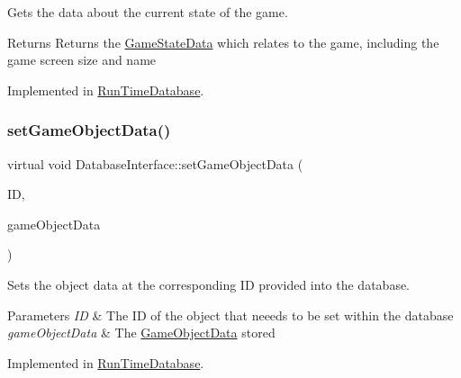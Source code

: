 Gets the data about the current state of the game. 

\begin{DoxyReturn}{Returns}
Returns the \hyperlink{struct_game_state_data}{Game\+State\+Data} which relates to the game, including the game screen size and name 
\end{DoxyReturn}


Implemented in \hyperlink{class_run_time_database_a15d6105d3d772f604c42813e50ba4ee3}{Run\+Time\+Database}.

\mbox{\label{class_database_interface_ae1914371cb425f71ba750f57f968b491}} 
\subsubsection{\texorpdfstring{set\+Game\+Object\+Data()}{setGameObjectData()}}
{\footnotesize\ttfamily virtual void Database\+Interface\+::set\+Game\+Object\+Data (\begin{DoxyParamCaption}\item[{std\+::string}]{ID,  }\item[{\hyperlink{struct_game_object_data}{Game\+Object\+Data}}]{game\+Object\+Data }\end{DoxyParamCaption})\hspace{0.3cm}{\ttfamily [pure virtual]}}



Sets the object data at the corresponding ID provided into the database. 


\begin{DoxyParams}{Parameters}
{\em ID} & The ID of the object that neeeds to be set within the database \\
\hline
{\em game\+Object\+Data} & The \hyperlink{struct_game_object_data}{Game\+Object\+Data} stored \\
\hline
\end{DoxyParams}


Implemented in \hyperlink{class_run_time_database_a9d2c5c2f1eb4dc728d69b9c5dbd1c22d}{Run\+Time\+Database}.

\mbox{\label{class_database_interface_a0b2f4402583b6ab31c70c713d72ceede}} 
